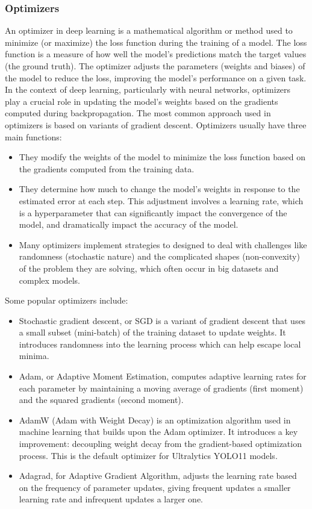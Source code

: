 \documentclass[12pt]{article}
\begin{document}
\subsubsection{Optimizers}

An optimizer in deep learning is a mathematical algorithm or method used to minimize (or maximize) the loss function during the training of a model. The loss function is a measure of how well the model’s predictions match the target values (the ground truth). The optimizer adjusts the parameters (weights and biases) of the model to reduce the loss, improving the model's performance on a given task.
In the context of deep learning, particularly with neural networks, optimizers play a crucial role in updating the model’s weights based on the gradients computed during backpropagation. The most common approach used in optimizers is based on variants of gradient descent. Optimizers usually have three main functions:
\begin{itemize}
  \item They modify the weights of the model to minimize the loss function based on the gradients computed from the training data.
  \item They determine how much to change the model’s weights in response to the estimated error at each step. This adjustment involves a learning rate, which is a hyperparameter that can significantly impact the convergence of the model, and dramatically impact the accuracy of the model.
  \item Many optimizers implement strategies to designed to deal with challenges like randomness (stochastic nature) and the complicated shapes (non-convexity) of the problem they are solving, which often occur in big datasets and complex models.
\end{itemize}

Some popular optimizers include:
\begin{itemize}
  \item Stochastic gradient descent, or SGD is a variant of gradient descent that uses a small subset (mini-batch) of the training dataset to update weights. It introduces randomness into the learning process which can help escape local minima.
  \item Adam, or Adaptive Moment Estimation, computes adaptive learning rates for each parameter by maintaining a moving average of gradients (first moment) and the squared gradients (second moment).
  \item AdamW (Adam with Weight Decay) is an optimization algorithm used in machine learning that builds upon the Adam optimizer. It introduces a key improvement: decoupling weight decay from the gradient-based optimization process. This is the default optimizer for Ultralytics YOLO11 models.
  \item Adagrad, for Adaptive Gradient Algorithm, adjusts the learning rate based on the frequency of parameter updates, giving frequent updates a smaller learning rate and infrequent updates a larger one.
\end{itemize}
\end{document}
